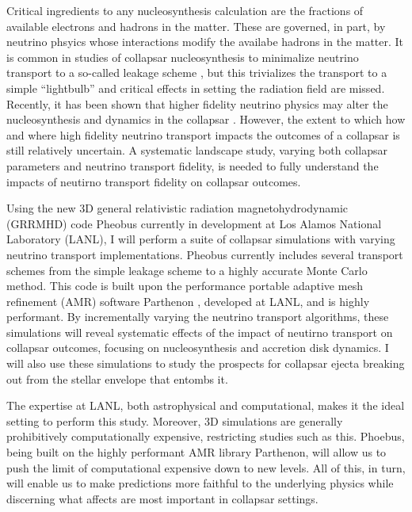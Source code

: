 \documentclass[12pt]{article}
\begin{document}
Critical ingredients to any nucleosynthesis calculation are the fractions of available electrons and hadrons in the matter.
These are governed, in part, by neutrino phsyics whose interactions modify the availabe hadrons in the matter.
It is common in studies of collapsar nucleosynthesis to minimalize neutrino transport to a so-called leakage scheme \citep{siegel:2019}, but this trivializes the transport to a simple ``lightbulb'' and critical effects in setting the radiation field are missed.
Recently, it has been shown that higher fidelity neutrino physics may alter the nucleosynthesis and dynamics in the collapsar \citep{miller:2020}.
However, the extent to which how and where high fidelity neutrino transport impacts the outcomes of a collapsar is still relatively uncertain.
A systematic landscape study, varying both collapsar parameters and neutrino transport fidelity, is needed to fully understand the impacts of neutirno transport fidelity on collapsar outcomes. 

Using the new 3D general relativistic radiation magnetohydrodynamic (GRRMHD) code Pheobus currently in development at Los Alamos National Laboratory (LANL), I will  perform a suite of collapsar simulations with varying neutrino transport implementations.
Pheobus currently includes several transport schemes from the simple leakage scheme to a highly accurate Monte Carlo method.
This code is built upon the performance portable adaptive mesh refinement (AMR) software Parthenon \citep{grete:2022}, developed at LANL, and is highly performant.
By incrementally varying the neutrino transport algorithms, these simulations will reveal systematic effects of the impact of neutirno transport on collapsar outcomes, focusing on nucleosynthesis and accretion disk dynamics.
I will also use these simulations to study the prospects for collapsar ejecta breaking out from the stellar envelope that entombs it.

The expertise at LANL, both astrophysical and computational, makes it the ideal setting to perform this study. 
Moreover, 3D simulations are generally prohibitively computationally expensive, restricting studies such as this.
Phoebus, being built on the highly performant AMR library Parthenon, will allow us to push the limit of computational expensive down to new levels. %
All of this, in turn, will enable us to make predictions more faithful to the underlying physics while discerning what affects are most important in collapsar settings.
\end{document}
